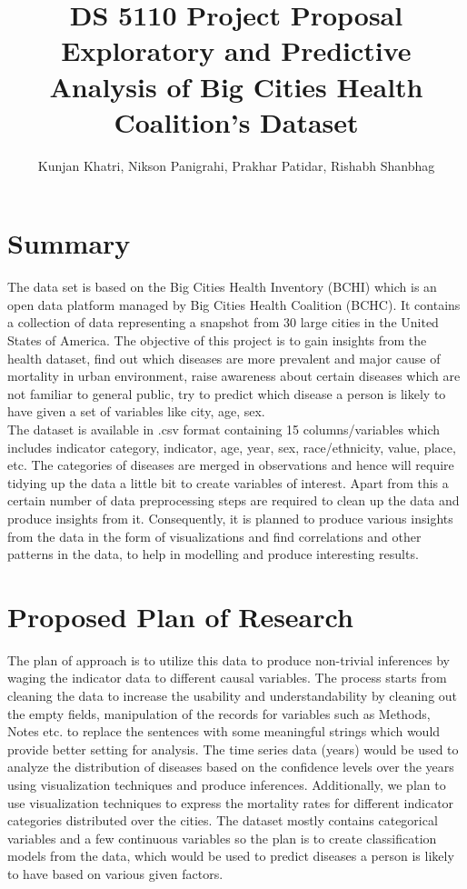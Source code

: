 \documentclass[11pt]{article}
\title{\textbf{DS 5110 Project Proposal} \\ Exploratory and Predictive Analysis of Big Cities Health Coalition’s Dataset}
\author{Kunjan Khatri, Nikson Panigrahi, Prakhar Patidar, Rishabh Shanbhag }
\date{}
\affil{Northeastern University, Boston, Massachusetts}
\begin{document}
  \maketitle
  \section{Summary}
  The data set is based on the Big Cities Health Inventory (BCHI) which is an open data platform managed by Big Cities Health Coalition (BCHC). It contains a collection of data representing a snapshot from 30 large cities in the United States of America.  The objective of this project is to gain insights from the health dataset, find out which diseases are more prevalent and major cause of mortality in urban environment, raise awareness about certain diseases which are not familiar to general public, try to predict which disease a person is likely to have given a set of variables like city, age, sex.
  \\
  The dataset is available in .csv format containing 15 columns/variables which includes indicator category, indicator, age, year, sex, race/ethnicity, value, place, etc. The categories of diseases are merged in observations and hence will require tidying up the data a little bit to create variables of interest. Apart from this a certain number of data preprocessing steps are required to clean up the data and produce insights from it. Consequently, it is planned to produce various insights from the data in the form of visualizations and find correlations and other patterns in the data, to help in modelling and produce interesting results. 

  \section{Proposed Plan of Research}
  The plan of approach is to utilize this data to produce non-trivial inferences by waging the indicator data to different causal variables. The process starts from cleaning the data to increase the usability and understandability by cleaning out the empty fields, manipulation of the records for variables such as Methods, Notes etc. to replace the sentences with some meaningful strings which would provide better setting for analysis. The time series data (years) would be used to analyze the distribution of diseases based on the confidence levels over the years using visualization techniques and produce inferences.  Additionally, we plan to use visualization techniques to express the mortality rates for different indicator categories distributed over the cities. The dataset mostly contains categorical variables and a few continuous variables so the plan is to create classification models from the data, which would be used to predict diseases a person is likely to have based on various given factors. 
\end{document}
